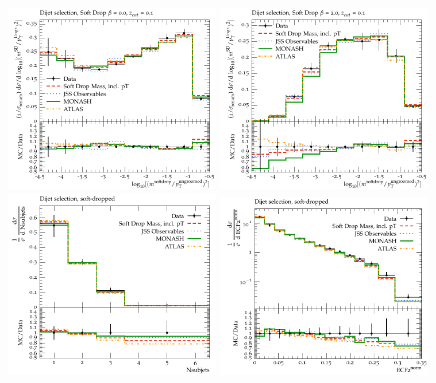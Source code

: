 \begin{figure}
\begin{center}
\includegraphics[width=0.49\textwidth]{figs/RivetPlotsFinal/SoftDropMass/d01-x01-y01.pdf} \hfill
\includegraphics[width=0.49\textwidth]{figs/RivetPlotsFinal/SoftDropMass/d03-x01-y01.pdf} \hfill
\includegraphics[width=0.49\textwidth]{figs/RivetPlotsFinal/ATLAS_2019_I1724098/d23-x01-y01.pdf} \hfill
\includegraphics[width=0.49\textwidth]{figs/RivetPlotsFinal/ATLAS_2019_I1724098/d27-x01-y01.pdf} \hfill
\end{center}
\label{allTune}
\end{figure}


